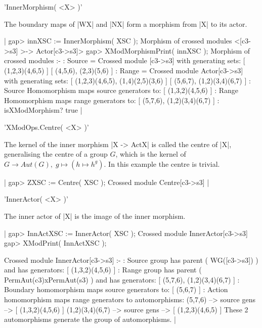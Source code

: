 %

'InnerMorphism( <X> )'

The boundary maps of |WX| and |NX| form a morphism from |X| to its actor.

|    gap> innXSC := InnerMorphism( XSC );
    Morphism of crossed modules <[c3->s3] >-> Actor[c3->s3]>
    gap> XModMorphismPrint( innXSC );
    Morphism of crossed modules :- 
    : Source = Crossed module [c3->s3] with generating sets:
      [ (1,2,3)(4,6,5) ]
      [ (4,5,6), (2,3)(5,6) ]
    :  Range = Crossed module Actor[c3->s3]
          with generating sets:
      [ (1,2,3)(4,6,5), (1,4)(2,5)(3,6) ]
      [ (5,6,7), (1,2)(3,4)(6,7) ]
    : Source Homomorphism maps source generators to:
      [ (1,3,2)(4,5,6) ]
    : Range Homomorphism maps range generators to:
      [ (5,7,6), (1,2)(3,4)(6,7) ]
    : isXModMorphism? true  |

%

'XModOps.Centre( <X> )'

The kernel of the inner morphism  |X -> ActX| is  called the centre of
|X|, generalising the centre of a group $G$, which is the kernel of $G
\to Aut(G), \; g \mapsto (h \mapsto h^g)$.  In this example the centre
is trivial.

|    gap> ZXSC := Centre( XSC );
    Crossed module Centre[c3->s3]  |

%

'InnerActor( <X> )'

The inner actor of |X| is the image of the inner morphism.

|    gap> InnActXSC := InnerActor( XSC );
    Crossed module InnerActor[c3->s3] 
    gap> XModPrint( InnActXSC );

    Crossed module InnerActor[c3->s3] :- 
    : Source group has parent ( WG([c3->s3]) ) and has generators:
      [ (1,3,2)(4,5,6) ]
    : Range group has parent ( PermAut(c3)xPermAut(s3) ) and has
        generators: [ (5,7,6), (1,2)(3,4)(6,7) ]
    : Boundary homomorphism maps source generators to:
      [ (5,6,7) ]
    : Action homomorphism maps range generators to automorphisms:
      (5,7,6) --> { source gens --> [ (1,3,2)(4,5,6) ] }
      (1,2)(3,4)(6,7) --> { source gens --> [ (1,2,3)(4,6,5) ] }
      These 2 automorphisms generate the group of automorphisms.  |

